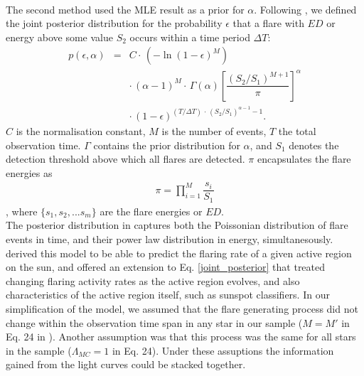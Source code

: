 \documentclass{aa}
\begin{document}
\\
The second method used the MLE result as a prior for $\alpha$. Following \citet{wheatland_flaresbayes_2004}, we defined the joint posterior distribution for the probability $\epsilon$ that a flare with $ED$ or energy above some value $S_2$ occurs within a time period $\Delta T$:
\begin{eqnarray}
\label{joint_posterior}
p(\epsilon, \alpha) &=& C \cdot\, (-\ln(1 - \epsilon)^{M})\nonumber\\
                    && \cdot\, (\alpha-1)^M \cdot\, \Gamma(\alpha) \left[\dfrac{(S_2 / S_1)^{M+1}}{\pi} \right]^{\alpha}\nonumber\\
                    && \cdot\, (1-\epsilon)^{(T / \Delta T) \,\cdot\, (S_2 /S_1)^{\alpha-1} -1 }.
\end{eqnarray}
$C$ is the normalisation constant, $M$ is the number of events, $T$ the total observation time. $\Gamma$ contains the prior distribution for $\alpha$, and $S_1$ denotes the detection threshold above which all flares are detected. $\pi$ encapsulates the flare energies as
\begin{eqnarray}
    \pi = \displaystyle \prod_{i=1}^M \dfrac{s_i}{S_1}
\end{eqnarray},
where $\{s_1,s_2,...s_m\}$ are the flare energies or $ED$.
\\
The posterior distribution in \citet{wheatland_flaresbayes_2004} captures both the Poissonian distribution of flare events in time, and their power law distribution in energy, simultanesously. \citet{wheatland_flaresbayes_2004} derived this model to be able to predict the flaring rate of a given active region on the sun, and offered an extension to Eq. \ref{joint_posterior} that treated changing flaring activity rates as the active region evolves, and also characteristics of the active region itself, such as sunspot classifiers. In our simplification of the model, we assumed that the flare generating process did not change within the observation time span in any star in our sample ($M=M'$ in Eq. 24 in \citet{wheatland_flaresbayes_2004}). Another assumption was that this process was the same for all stars in the sample ($\Lambda_{MC}=1$ in Eq. 24). Under these assuptions the information gained from the light curves could be stacked together.
\\
\end{document}
